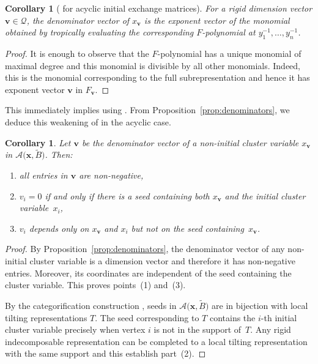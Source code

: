 \documentclass[pdftex]{sigma}
\newcommand{\bfv}{\mathbf{v}}
\newcommand{\bfx}{\mathbf{x}}
\newcommand{\cA}{\mathcal{A}}
\newcommand{\cQ}{\mathcal{Q}}
\numberwithin{equation}{section}
\newtheorem{Corollary}[Theorem]{Corollary}
\begin{document}
 \begin{Corollary}[{\cite[Conjecture 7.17]{fomin-zelevinsky4} for acyclic initial exchange matrices}]
 For a rigid dimension vector $\bfv\in\cQ$, the denominator vector of $x_\bfv$ is the exponent vector of the monomial obtained by tropically evaluating the corresponding $F$-polynomial at $y_1^{-1},\dots,y_n^{-1}$.
 \end{Corollary}
 \begin{proof}
 It is enough to observe that the $F$-polynomial has a unique monomial of maximal degree and this monomial is divisible by all other monomials.
 Indeed, this is the monomial corresponding to the full subrepresentation and hence it has exponent vector $\bfv$ in $F_\bfv$.
 \end{proof}
 This immediately implies \cite[Conjecture 6.11]{fomin-zelevinsky4} using \cite[Proposition 7.16]{fomin-zelevinsky4}.
 From Proposition~\ref{prop:denominators}, we deduce this weakening of \cite[Conjecture 7.4]{fomin-zelevinsky4} in the acyclic case.
 \begin{Corollary}
 \label{cor:sign_coherence}
 Let $\bfv$ be the denominator vector of a non-initial cluster variable $x_\bfv$ in $\cA\big(\bfx,\widetilde{B}\big)$.
 Then:
 \begin{enumerate}\itemsep=0pt
\item[$1)$]all entries in $\bfv$ are non-negative,
\item[$2)$]$v_i=0$ if and only if there is a seed containing both $x_\bfv$ and the initial cluster variable~$x_i$,
\item[$3)$]$v_i$ depends only on $x_\bfv$ and $x_i$ but not on the seed containing~$x_\bfv$.
 \end{enumerate}
 \end{Corollary}
\begin{proof} By Proposition~\ref{prop:denominators}, the denominator vector of any non-initial cluster variable is a dimension vector and therefore it has non-negative entries. Moreover, its coordinates are independent of the seed containing the cluster variable. This proves points~(1) and~(3).

By the categorification construction \cite{rupel2}, seeds in $\cA\big(\bfx,\widetilde{B}\big)$ are in bijection with local tilting representations $T$. The seed corresponding to $T$ contains the $i$-th initial cluster variable precisely when vertex $i$ is not in the support of~$T$. Any rigid indecomposable representation can be completed to a local tilting representation with the same support and this establish part~(2).
\end{proof}
\end{document}
